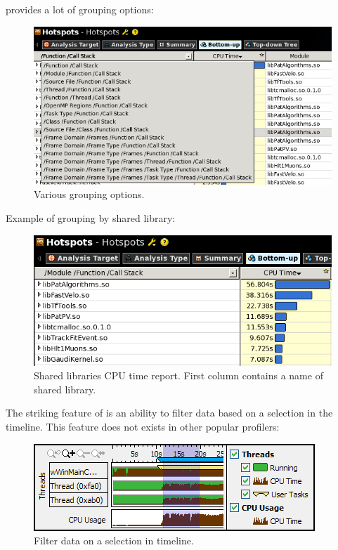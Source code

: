 \documentclass[a4paper]{jpconf}
\begin{document}
\amp provides a lot of grouping options: 
\begin{figure}[H]
\begin{minipage}{\textwidth}
\includegraphics[width=\textwidth]{figs/fig02.png}
\caption{\label{fig02}Various grouping options.}
\end{minipage}
\end{figure}

Example of grouping by shared library:

\begin{figure}[H]
\begin{minipage}{\textwidth}
\includegraphics[width=\textwidth]{figs/fig03.png}
\caption{\label{fig03}Shared libraries  CPU time report. First column contains a name of shared library.}
\end{minipage}
\end{figure}


The striking feature of \amp is an ability to filter data based on a selection in the timeline. This feature 
does not exists in other popular profilers:

\begin{figure}[H]
\begin{minipage}{\textwidth}
\includegraphics[]{figs/fig04.png}
\caption{\label{fig04}Filter data on a selection in timeline.}
\end{minipage}
\end{figure}
\end{document}
